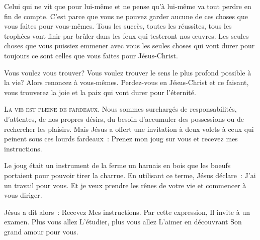 
Celui qui ne vit que pour lui-même et ne pense qu'à lui-même va tout perdre
 en fin de compte. C'est parce que vous ne pouvez garder aucune
 de ces choses que vous faites pour vous-mêmes. Tous les succès,
 toutes les réussites, tous les trophées vont finir par brûler
 dans les feux qui testeront nos œuvres. Les seules choses
 que vous puissiez emmener avec vous \ocadr les seules choses
 qui vont durer pour toujours \fcadr{} ce sont celles
 que vous faites pour Jésus-Christ. 

Vous voulez vous trouver? Vous voulez trouver le sens le plus profond
 possible à la vie? Alors renoncez à vous-mêmes. Perdez-vous
 en Jésus-Christ et ce faisant, vous trouverez la joie et la paix
 qui vont durer pour l'éternité. 

\dvrule






\lettrine{L}{a vie est pleine de fardeaux.}
 Nous sommes surchargés de responsabilités, d'attentes,
 de nos propres désirs, du besoin d'accumuler des possessions
 ou de rechercher les plaisirs.
 Mais Jésus a offert une invitation à deux volets à ceux
 qui peinent sous ces lourds fardeaux~:
 \og Prenez mon joug sur vous et recevez mes instructions. \fg{}

Le joug était un instrument de la ferme \ocadr un harnais en bois
 que les boeufs portaient pour pouvoir tirer la charrue.
 En utilisant ce terme, Jésus déclare~: 
 \og J'ai un travail pour vous. Et je veux prendre les rênes
 de votre vie et commencer à vous diriger. \fg{}


Jésus a dit alors~:  \og Recevez Mes instructions. \fg{}
 Par cette expression, Il invite à un examen. Plus vous allez L'étudier,
 plus vous allez L'aimer en découvrant Son grand amour pour vous. 

